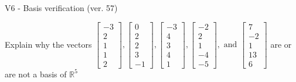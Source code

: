 \begin{exercise}
  \begin{exerciseTitle}V6 - Basis verification (ver. 57)\end{exerciseTitle}
  \begin{exerciseStatement}
    Explain why the vectors \(\left[\begin{array}{r}
-3 \\
2 \\
1 \\
1 \\
2
\end{array}\right] , \left[\begin{array}{r}
0 \\
2 \\
2 \\
3 \\
-1
\end{array}\right] , \left[\begin{array}{r}
-3 \\
4 \\
3 \\
4 \\
1
\end{array}\right] , \left[\begin{array}{r}
-2 \\
2 \\
1 \\
-4 \\
-5
\end{array}\right] , \text{ and } \left[\begin{array}{r}
7 \\
-2 \\
1 \\
13 \\
6
\end{array}\right]\) are or are not a basis of \(\mathbb{R}^5\)	



\end{exerciseStatement}
\end{exercise}
